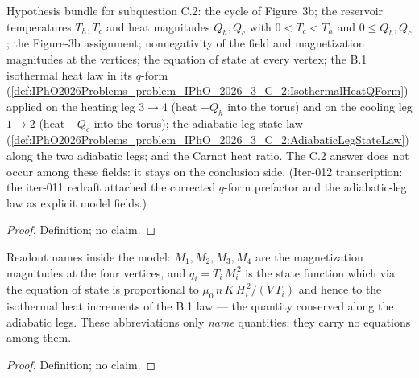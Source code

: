 \begin{definition}
\label{def:IPhO2026Problems_problem_IPhO_2026_3_C_2:CarnotMagnetizationModel}
Hypothesis bundle for subquestion C.2: the cycle of Figure~3b; the
reservoir temperatures $T_h, T_c$ and heat magnitudes $Q_h, Q_c$ with
$0 < T_c < T_h$ and $0 \le Q_h, Q_c$; the Figure-3b assignment;
nonnegativity of the field and magnetization magnitudes at the
vertices; the equation of state at every vertex; the B.1 isothermal
heat law in its $q$-form
(\cref{def:IPhO2026Problems_problem_IPhO_2026_3_C_2:IsothermalHeatQForm})
applied on the heating leg $3 \to 4$ (heat $-Q_h$ into the torus) and
on the cooling leg $1 \to 2$ (heat $+Q_c$ into the torus); the
adiabatic-leg state law
(\cref{def:IPhO2026Problems_problem_IPhO_2026_3_C_2:AdiabaticLegStateLaw})
along the two adiabatic legs; and the Carnot heat ratio. The C.2 answer
does not occur among these fields: it stays on the conclusion side.
(Iter-012 transcription: the iter-011 redraft attached the corrected
$q$-form prefactor and the adiabatic-leg law as explicit model fields.)
\end{definition}
\begin{proof}
Definition; no claim.
\end{proof}

\begin{definition}
\label{def:IPhO2026Problems_problem_IPhO_2026_3_C_2:q}
Readout names inside the model: $M_1, M_2, M_3, M_4$ are the
magnetization magnitudes at the four vertices, and
$q_i = T_i\,M_i^{\,2}$ is the state function which via the equation of
state is proportional to $\mu_0\,n\,K\,H_i^{\,2}/(V\,T_i)$ and hence
to the isothermal heat increments of the B.1 law --- the quantity
conserved along the adiabatic legs. These abbreviations only
\emph{name} quantities; they carry no equations among them.
\end{definition}
\begin{proof}
Definition; no claim.
\end{proof}

